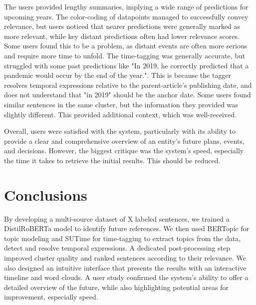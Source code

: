 \documentclass[10pt,twocolumn]{article}
\begin{document}
The users provided lengthy summaries, implying a wide range of predictions for upcoming years. The color-coding of datapoints managed to successfully convey relevance, but users noticed that nearer predictions were generally marked as more relevant, while key distant predictions often had lower relevance scores. Some users found this to be a problem, as distant events are often more serious and require more time to unfold. The time-tagging was generally accurate, but struggled with some past predictions like "In 2019, he correctly predicted that a pandemic would occur by the end of the year.". This is because the tagger resolves temporal expressions relative to the parent-article's publishing date, and does not understand that "in 2019" should be the anchor date. Some users found similar sentences in the same cluster, but the information they provided was slightly different. This provided additional context, which was well-received.

Overall, users were satisfied with the system, particularly with its ability to provide a clear and comprehensive overview of an entity's future plans, events, and decisions. However, the biggest critique was the system's speed, especially the time it takes to retrieve the initial results. This should be reduced.


\section{Conclusions}
By developing a multi-source dataset of X labeled sentences, we trained a DistilRoBERTa model to identify future references.  We then used BERTopic for topic modeling and SUTime for time-tagging to extract topics from the data, detect and resolve temporal expressions. A dedicated post-processing step improved cluster quality and ranked sentences according to their relevance. We also designed an intuitive interface that presents the results with an interactive timeline and word clouds. A user study confirmed the system's ability to offer a detailed overview of the future, while also highlighting potential areas for improvement, especially speed.




\small


\end{document}
